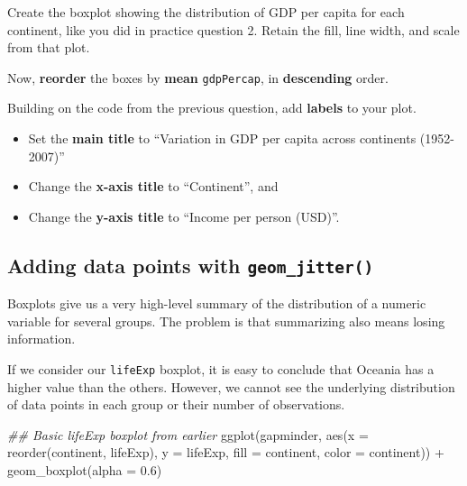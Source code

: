 \documentclass[
  letterpaper,
  DIV=11,
  numbers=noendperiod]{scrreprt}
\newenvironment{Shaded}{\begin{snugshade}}{\end{snugshade}}
\newcommand{\AttributeTok}[1]{\textcolor[rgb]{0.40,0.45,0.13}{#1}}
\newcommand{\DocumentationTok}[1]{\textcolor[rgb]{0.37,0.37,0.37}{\textit{#1}}}
\newcommand{\FloatTok}[1]{\textcolor[rgb]{0.68,0.00,0.00}{#1}}
\newcommand{\FunctionTok}[1]{\textcolor[rgb]{0.28,0.35,0.67}{#1}}
\newcommand{\NormalTok}[1]{\textcolor[rgb]{0.00,0.23,0.31}{#1}}
\newcommand{\SpecialCharTok}[1]{\textcolor[rgb]{0.37,0.37,0.37}{#1}}
\begin{document}
\begin{tcolorbox}[enhanced jigsaw, title=\textcolor{quarto-callout-tip-color}{\faLightbulb}\hspace{0.5em}{Practice}, colbacktitle=quarto-callout-tip-color!10!white, leftrule=.75mm, arc=.35mm, opacityback=0, bottomrule=.15mm, rightrule=.15mm, toptitle=1mm, breakable, toprule=.15mm, colback=white, coltitle=black, colframe=quarto-callout-tip-color-frame, bottomtitle=1mm, titlerule=0mm, left=2mm, opacitybacktitle=0.6]

Create the boxplot showing the distribution of GDP per capita for each
continent, like you did in practice question 2. Retain the fill, line
width, and scale from that plot.

Now, \textbf{reorder} the boxes by \textbf{mean} \texttt{gdpPercap}, in
\textbf{descending} order.

Building on the code from the previous question, add \textbf{labels} to
your plot.

\begin{itemize}
\item
  Set the \textbf{main title} to ``Variation in GDP per capita across
  continents (1952-2007)''
\item
  Change the \textbf{x-axis title} to ``Continent'', and
\item
  Change the \textbf{y-axis title} to ``Income per person (USD)''.
\end{itemize}

\end{tcolorbox}

\subsection{\texorpdfstring{Adding data points with
\texttt{geom\_jitter()}}{Adding data points with geom\_jitter()}}\label{adding-data-points-with-geom_jitter}

Boxplots give us a very high-level summary of the distribution of a
numeric variable for several groups. The problem is that summarizing
also means losing information.

If we consider our \texttt{lifeExp} boxplot, it is easy to conclude that
Oceania has a higher value than the others. However, we cannot see the
underlying distribution of data points in each group or their number of
observations.

\begin{Shaded}
\begin{Highlighting}[]
\DocumentationTok{\#\# Basic lifeExp boxplot from earlier}
\FunctionTok{ggplot}\NormalTok{(gapminder, }
       \FunctionTok{aes}\NormalTok{(}\AttributeTok{x =} \FunctionTok{reorder}\NormalTok{(continent, lifeExp),}
           \AttributeTok{y =}\NormalTok{ lifeExp, }
           \AttributeTok{fill =}\NormalTok{ continent,}
           \AttributeTok{color =}\NormalTok{ continent)) }\SpecialCharTok{+}
  \FunctionTok{geom\_boxplot}\NormalTok{(}\AttributeTok{alpha =} \FloatTok{0.6}\NormalTok{)}
\end{Highlighting}
\end{Shaded}
\end{document}
